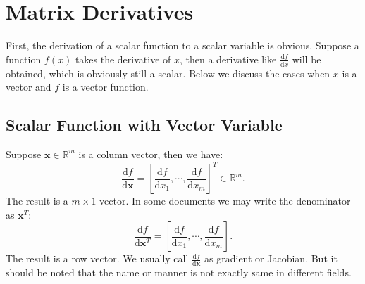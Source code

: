 \chapter{Matrix Derivatives}
\label{cpt:app-B}
First, the derivation of a scalar function to a scalar variable is obvious. Suppose a function $f(x)$ takes the derivative of $x$, then a derivative like $\frac{\mathrm{d}f}{\mathrm{d}x}$ will be obtained, which is obviously still a scalar. Below we discuss the cases when $x$ is a vector and $f$ is a vector function.

\section{Scalar Function with Vector Variable}
Suppose $\mathbf{x} \in \mathbb{R}^m$ is a column vector, then we have:
\begin{equation}
	\frac{{\mathrm{d}f}}{{\mathrm{d}\mathbf{x}}} = {\left[ {\frac{{\mathrm{d}f}}{{\mathrm{d}{x_1}}}, \cdots ,\frac{{\mathrm{d}f}}{{\mathrm{d}{x_m}}}} \right]^T} \in {\mathbb{R}^m}.
\end{equation}
The result is a $m \times 1$ vector. In some documents we may write the denominator as $\mathbf{x}^T$:
\begin{equation}
	\frac{{\mathrm{d}f}}{{\mathrm{d}\mathbf{x}^T}} =  {\left[ {\frac{{\mathrm{d}f}}{{\mathrm{d}{x_1}}}, \cdots ,\frac{{\mathrm{d}f}}{{\mathrm{d}{x_m}}}} \right]}.
\end{equation}
The result is a row vector. We usually call $\frac{\mathrm{d}f}{\mathrm{d}\mathbf{x}}$ as gradient or Jacobian. But it should be noted that the name or manner is not exactly same in different fields.

